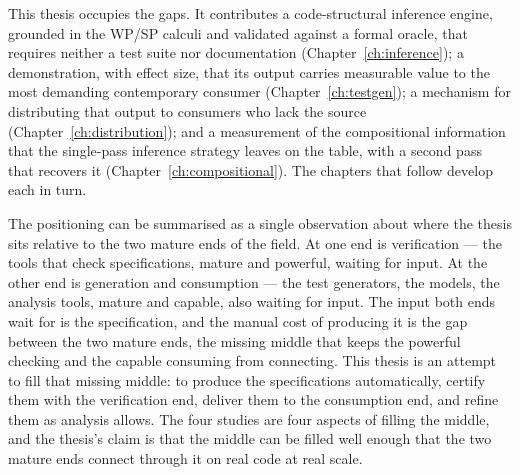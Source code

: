 This thesis occupies the gaps. It contributes a code-structural inference
engine, grounded in the WP/SP calculi and validated against a formal oracle,
that requires neither a test suite nor documentation
(Chapter~\ref{ch:inference}); a demonstration, with effect size, that its
output carries measurable value to the most demanding contemporary consumer
(Chapter~\ref{ch:testgen}); a mechanism for distributing that output to
consumers who lack the source (Chapter~\ref{ch:distribution}); and a
measurement of the compositional information that the single-pass inference
strategy leaves on the table, with a second pass that recovers it
(Chapter~\ref{ch:compositional}). The chapters that follow develop each in
turn.

The positioning can be summarised as a single observation about where the thesis
sits relative to the two mature ends of the field. At one end is verification ---
the tools that check specifications, mature and powerful, waiting for input. At the
other end is generation and consumption --- the test generators, the models, the
analysis tools, mature and capable, also waiting for input. The input both ends
wait for is the specification, and the manual cost of producing it is the gap
between the two mature ends, the missing middle that keeps the powerful checking
and the capable consuming from connecting. This thesis is an attempt to fill that
missing middle: to produce the specifications automatically, certify them with the
verification end, deliver them to the consumption end, and refine them as analysis
allows. The four studies are four aspects of filling the middle, and the thesis's
claim is that the middle can be filled well enough that the two mature ends connect
through it on real code at real scale.
